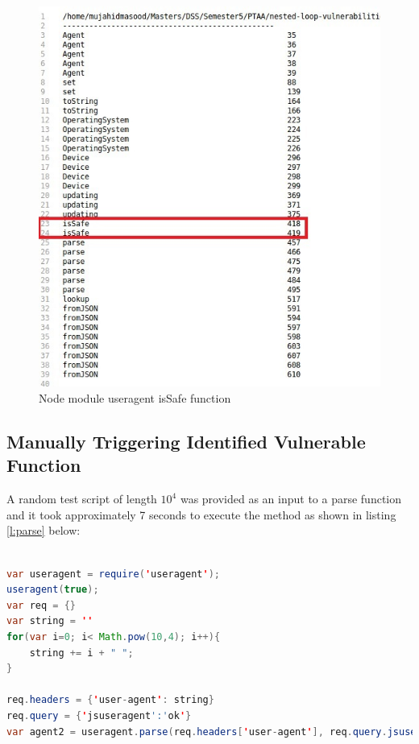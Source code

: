 \documentclass[authoryear,preprint]{sigplanconf}
\begin{document}
\begin{figure}[ht]
\centering
\includegraphics[width=0.8\linewidth]{figures/useragent-result}
\caption[Node module useragent isSafe function]{\label{f:result}Node module useragent isSafe function}
\end{figure}



\subsection{Manually Triggering Identified Vulnerable Function}

A random test script of length  \begin{math}10^{4} \end{math} was provided as an input to a parse function and it took approximately 7 seconds to execute the method as shown in listing \ref{l:parse} below:

\begin{lstlisting}[caption=Manual Triggering of vulnerable function in npm module useragent,label=l:parse,language=Java]

var useragent = require('useragent');
useragent(true);
var req = {}
var string = ''
for(var i=0; i< Math.pow(10,4); i++){
    string += i + " ";
}

req.headers = {'user-agent': string}
req.query = {'jsuseragent':'ok'}
var agent2 = useragent.parse(req.headers['user-agent'], req.query.jsuseragent);

\end{lstlisting}
\end{document}
